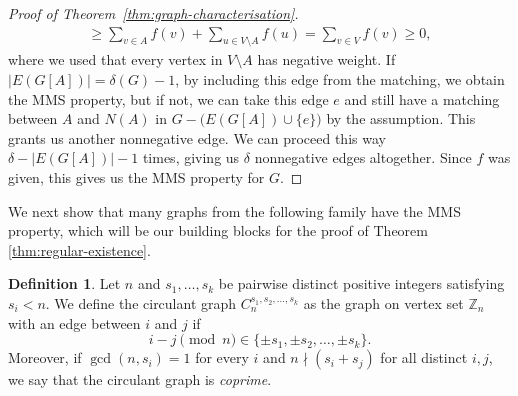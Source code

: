 \documentclass[12pt,UKenglish]{amsart}
\theoremstyle{plain}
\theoremstyle{definition}
\newtheorem{defn}[thm]{Definition}
\theoremstyle{remark}
\begin{document}
\begin{proof}[Proof of Theorem~\ref{thm:graph-characterisation}]
\begin{align*}
 \ge \sum_{v\in A}f(v)+\sum_{u\in V\setminus A}f(u)=\sum_{v\in V}f(v)\ge0,
   \end{align*}
   where we used that every vertex in $V\setminus A$ has negative weight.
 If $|E(G[A])|=\delta(G)-1$, by including this edge from the matching, we obtain the MMS property, but if not, we can take this edge $e$ and still have a matching between $A$ and $N(A)$ in $G-\bigl(E(G[A])\cup\{e\}\bigr)$ by the assumption.
 This grants us another nonnegative edge. We can proceed this way $\delta-|E(G[A])|-1$ times, giving us $\delta$ nonnegative edges altogether.
 Since $f$ was given, this gives us the MMS property for $G$.
 \end{proof}
 We next show that many graphs from the following family have the MMS property, which will be our building blocks for the proof of Theorem \ref{thm:regular-existence}.
 \begin{defn}
   Let $n$ and $s_1,\dots,s_k$ be pairwise distinct positive integers satisfying $s_i<n$.
 We define the circulant graph $C_n^{s_1,s_2,\dots,s_k}$ as the graph on vertex set $\mathbb{Z}_n$ with an edge between $i$ and $j$ if
\[
i-j \pmod n \in \{\pm s_1,\pm s_2,\dots,\pm s_k\}.
\]
 Moreover, if $\gcd(n,s_i)=1$ for every $i$ and $n\nmid (s_i+s_j)$ for all distinct $i,j$, we say that the circulant graph is \textit{coprime}.
 \end{defn}
 
\end{document}
